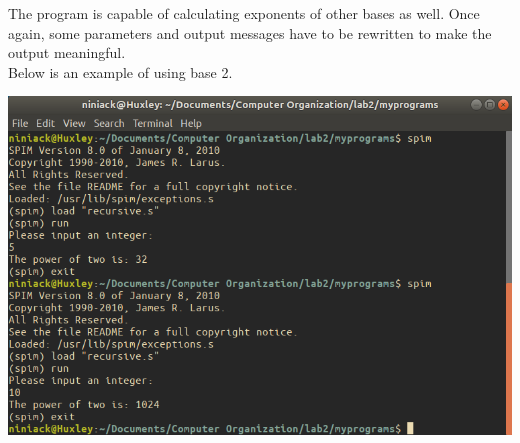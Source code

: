 \documentclass[twocolumn]{article}
\begin{document}
The program is capable of calculating exponents of other bases as well. Once again, some parameters and output messages have to be rewritten to make the output meaningful. \\

Below is an example of using base 2. 

\begin{center}
  \includegraphics[scale=0.45]{Lab2-images/recursive2.png}
\end{center}







\printbibliography
\end{document}
